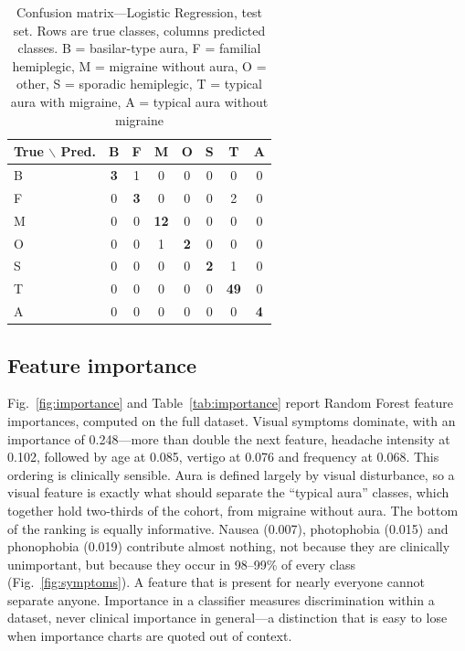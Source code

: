 \documentclass[conference]{IEEEtran}
\begin{document}
\begin{table}[t]
\centering
\caption{Confusion matrix---Logistic Regression, test set. Rows are true classes, columns predicted classes. B = basilar-type aura, F = familial hemiplegic, M = migraine without aura, O = other, S = sporadic hemiplegic, T = typical aura with migraine, A = typical aura without migraine}
\label{tab:confusion}
\small
\begin{tabular}{lccccccc}
\toprule
True $\backslash$ Pred. & B & F & M & O & S & T & A \\
\midrule
B & \textbf{3} & 1 & 0 & 0 & 0 & 0 & 0 \\
F & 0 & \textbf{3} & 0 & 0 & 0 & 2 & 0 \\
M & 0 & 0 & \textbf{12} & 0 & 0 & 0 & 0 \\
O & 0 & 0 & 1 & \textbf{2} & 0 & 0 & 0 \\
S & 0 & 0 & 0 & 0 & \textbf{2} & 1 & 0 \\
T & 0 & 0 & 0 & 0 & 0 & \textbf{49} & 0 \\
A & 0 & 0 & 0 & 0 & 0 & 0 & \textbf{4} \\
\bottomrule
\end{tabular}
\end{table}

\subsection{Feature importance}
Fig.~\ref{fig:importance} and Table~\ref{tab:importance} report Random Forest feature importances, computed on the full dataset. Visual symptoms dominate, with an importance of 0.248---more than double the next feature, headache intensity at 0.102, followed by age at 0.085, vertigo at 0.076 and frequency at 0.068. This ordering is clinically sensible. Aura is defined largely by visual disturbance, so a visual feature is exactly what should separate the ``typical aura'' classes, which together hold two-thirds of the cohort, from migraine without aura. The bottom of the ranking is equally informative. Nausea (0.007), photophobia (0.015) and phonophobia (0.019) contribute almost nothing, not because they are clinically unimportant, but because they occur in 98--99\% of every class (Fig.~\ref{fig:symptoms}). A feature that is present for nearly everyone cannot separate anyone. Importance in a classifier measures discrimination within a dataset, never clinical importance in general---a distinction that is easy to lose when importance charts are quoted out of context.
\end{document}
